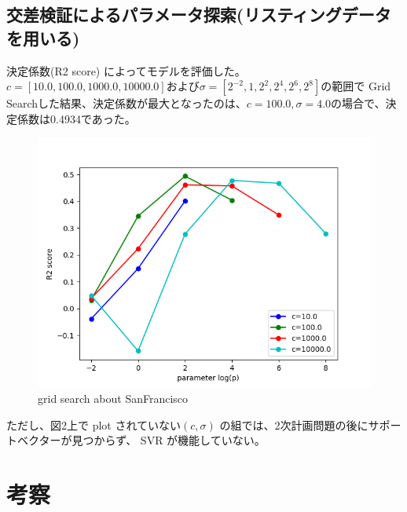 \documentclass{jsarticle}
\begin{document}
\subsection{交差検証によるパラメータ探索(リスティングデータを用いる)}
決定係数(R2 score) によってモデルを評価した。
$c = [10.0, 100.0, 1000.0, 10000.0]$および$\sigma=[2^{-2}, 1, 2^2, 2^4, 2^6, 2^8]$の範囲で
Grid Searchした結果、決定係数が最大となったのは、$c=100.0, \sigma=4.0$の場合で、決定係数は0.4934であった。
\begin{figure}[!h]
\includegraphics[width=15cm]{grid_sanfrancisco.png}
\caption{grid search about SanFrancisco}
\end{figure}
ただし、図2上で plot されていない$(c,　\sigma)$ の組では、2次計画問題の後にサポートベクターが見つからず、
SVR が機能していない。

\section{考察}

\end{document}
